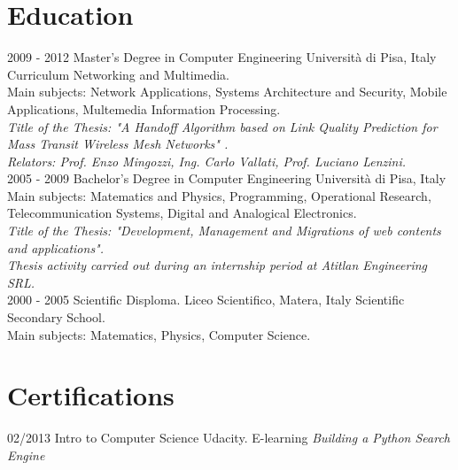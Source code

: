 \documentclass[]{friggeri-cv}
\begin{document}
\section{Education}
\begin{entrylist}
  \entry
    {2009 - 2012}
    {Master's Degree in Computer Engineering}
    {Università di Pisa, Italy}
    {Curriculum Networking and Multimedia.\\
    Main subjects: Network Applications, Systems Architecture and Security, Mobile Applications, Multemedia Information            Processing.\\
    \emph{Title of the Thesis: "A Handoff Algorithm based on Link Quality Prediction for Mass Transit Wireless Mesh Networks"      .}\\
    \emph{Relators: Prof. Enzo Mingozzi, Ing. Carlo Vallati, Prof. Luciano Lenzini.}\\}
  \entry
    {2005 - 2009}
    {Bachelor's Degree in Computer Engineering}
    {Università di Pisa, Italy}
    {Main subjects: Matematics and Physics, Programming, Operational Research, Telecommunication Systems, Digital and Analogical Electronics.\\
    \emph{Title of the Thesis: "Development, Management and Migrations of web contents and applications".}\\
    \emph{Thesis activity carried out during an internship period at Atitlan Engineering SRL.}\\}
  \entry
    {2000 - 2005}
    {Scientific Disploma.}
    {Liceo Scientifico, Matera, Italy}
    {Scientific Secondary School.\\
    Main subjects: Matematics, Physics, Computer Science.}
\end{entrylist}

\section{Certifications}
\begin{entrylist}
  \entry
    {02/2013}
    {Intro to Computer Science}
    {Udacity. E-learning}
    {\emph{Building a Python Search Engine}}
\end{entrylist}

\newpage
\end{document}
